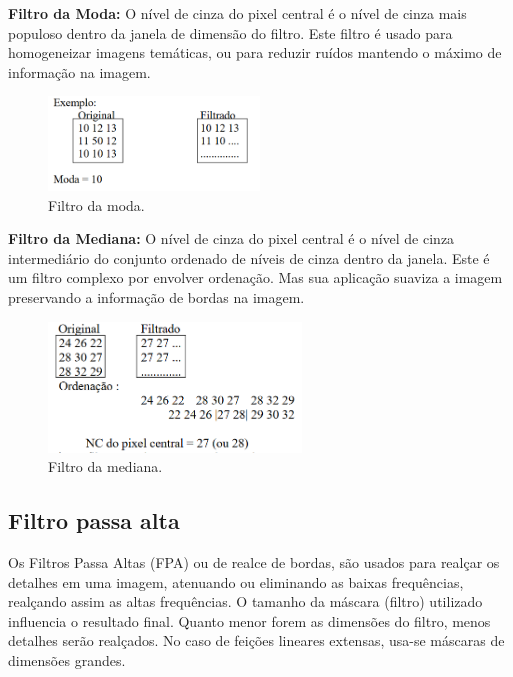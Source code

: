 \documentclass{article}
\begin{document}
    \textbf{Filtro da Moda:} O nível de cinza do pixel central é o nível de cinza mais populoso dentro da janela de dimensão do filtro. Este  filtro  é  usado  para  homogeneizar  imagens  temáticas,  ou  para  reduzir ruídos mantendo o máximo de informação na imagem. 
    
     \begin{figure}[H]
        \centering
        \includegraphics[width=0.5\textwidth]{template/img/fig7.png}
        \caption{Filtro da moda.}
        \label{fig:fig7}
    \end{figure}
    
    \textbf{Filtro  da  Mediana:} O  nível  de  cinza  do  pixel  central  é  o  nível  de cinza  intermediário  do  conjunto  ordenado  de  níveis  de  cinza  dentro  da janela. Este  é  um  filtro  complexo  por  envolver  ordenação.  Mas  sua aplicação suaviza a imagem preservando a informação de bordas na imagem. 
    
    \begin{figure}[H]
        \centering
        \includegraphics[width=0.6\textwidth]{template/img/fig8.png}
        \caption{Filtro da mediana.}
        \label{fig:fig8}
    \end{figure}
    
    \subsection{Filtro passa alta}
    
    Os Filtros  Passa  Altas  (FPA)  ou  de  realce  de  bordas, são usados para realçar os detalhes em uma imagem, atenuando  ou  eliminando  as  baixas  frequências,  realçando  assim as altas frequências. O   tamanho   da   máscara   (filtro)   utilizado   influencia   o   resultado  final.  Quanto  menor  forem  as  dimensões  do  filtro,  menos  detalhes  serão  realçados.  No  caso  de  feições  lineares  extensas,  usa-se  máscaras de dimensões grandes. 
    
\end{document}
